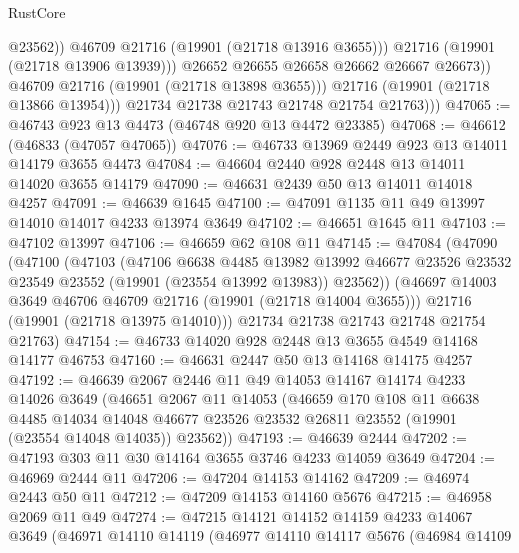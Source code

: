 \begin{lexlean}{RustCore}
\begin{coremodule}
                          @23562))
                      @46709
                      @21716
                      (@19901 (@21718 @13916 @3655)))
                    @21716
                    (@19901 (@21718 @13906 @13939)))
                  @26652
                  @26655
                  @26658
                  @26662
                  @26667
                  @26673))
              @46709
              @21716
              (@19901 (@21718 @13898 @3655)))
            @21716
            (@19901 (@21718 @13866 @13954)))
          @21734
          @21738
          @21743
          @21748
          @21754
          @21763)))
@47065 := @46743 @923 @13 @4473 (@46748 @920 @13 @4472 @23385)
@47068 := @46612 (@46833 (@47057 @47065))
@47076 := @46733 @13969 @2449 @923 @13 @14011 @14179 @3655 @4473
@47084 := @46604 @2440 @928 @2448 @13 @14011 @14020 @3655 @14179
@47090 := @46631 @2439 @50 @13 @14011 @14018 @4257
@47091 := @46639 @1645
@47100 := @47091 @1135 @11 @49 @13997 @14010 @14017 @4233 @13974 @3649
@47102 := @46651 @1645 @11
@47103 := @47102 @13997
@47106 := @46659 @62 @108 @11
@47145 := @47084
    (@47090
      (@47100
        (@47103
          (@47106
            @6638
            @4485
            @13982
            @13992
            @46677
            @23526
            @23532
            @23549
            @23552
            (@19901 (@23554 @13992 @13983))
            @23562))
        (@46697 @14003 @3649 @46706 @46709 @21716 (@19901 (@21718 @14004 @3655)))
        @21716
        (@19901 (@21718 @13975 @14010)))
      @21734
      @21738
      @21743
      @21748
      @21754
      @21763)
@47154 := @46733 @14020 @928 @2448 @13 @3655 @4549 @14168 @14177 @46753
@47160 := @46631 @2447 @50 @13 @14168 @14175 @4257
@47192 := @46639
    @2067
    @2446
    @11
    @49
    @14053
    @14167
    @14174
    @4233
    @14026
    @3649
    (@46651
      @2067
      @11
      @14053
      (@46659
        @170
        @108
        @11
        @6638
        @4485
        @14034
        @14048
        @46677
        @23526
        @23532
        @26811
        @23552
        (@19901 (@23554 @14048 @14035))
        @23562))
@47193 := @46639 @2444
@47202 := @47193 @303 @11 @30 @14164 @3655 @3746 @4233 @14059 @3649
@47204 := @46969 @2444 @11
@47206 := @47204 @14153 @14162
@47209 := @46974 @2443 @50 @11
@47212 := @47209 @14153 @14160 @5676
@47215 := @46958 @2069 @11 @49
@47274 := @47215
    @14121
    @14152
    @14159
    @4233
    @14067
    @3649
    (@46971
      @14110
      @14119
      (@46977
        @14110
        @14117
        @5676
        (@46984
          @14109

\end{coremodule}
\end{lexlean}
